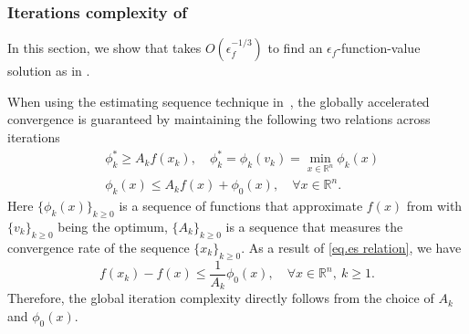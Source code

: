 \documentclass{article}
\numberwithin{equation}{section}
\numberwithin{equation}{section}
\begin{document}
\subsubsection{Iterations complexity of }
In this section, we show that  takes $O(\epsilon_f^{-1/3})$ to find an $\epsilon_f$-function-value solution as in .

When using the estimating sequence technique in~\cite{nesterov2008accelerating}, the globally accelerated convergence is guaranteed by maintaining the following two relations across iterations
\begin{subequations}\label{eq.es relation}
    \begin{align}
        \label{eq.es relation 1}
         & \phi_k^*  \geq A_k f(x_k), \quad  \phi_k^*= \phi_k(v_k) =\min_{x\in\mathbb{R}^n}\phi_k(x) \\
        \label{eq.es relation 2}
         & \phi_k(x)\leq A_kf(x)+\phi_0(x), \quad \forall x\in\mathbb{R}^n.
    \end{align}
\end{subequations}
Here $\{\phi_k(x)\}_{k\geq 0}$ is a sequence of functions that approximate $f(x)$ from with $\{v_k\}_{k\geq0}$ being the optimum, $\{A_k\}_{k\geq 0}$ is a sequence that measures the convergence rate of the sequence $\{x_k\}_{k\geq 0}$. As a result of \eqref{eq.es relation}, we have
\begin{equation*}
    f(x_k)-f(x)\leq \frac{1}{A_k}\phi_0(x),\quad \forall x\in \mathbb{R}^n, \  k\geq 1.
\end{equation*}
Therefore, the global iteration complexity directly follows from the choice of $A_k$ and $\phi_0(x)$.
\end{document}
